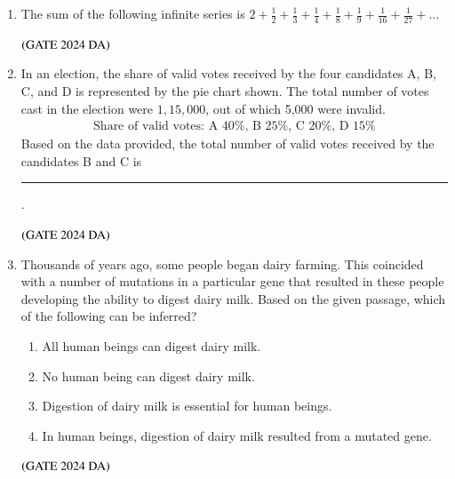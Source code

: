 \documentclass[journal,12pt,onecolumn]{IEEEtran}
\theoremstyle{remark}
\begin{document}
\begin{enumerate}
\item The sum of the following infinite series is $2+\frac{1}{2}+\frac{1}{3}+\frac{1}{4}+\frac{1}{8}+\frac{1}{9}+\frac{1}{16}+\frac{1}{27}+\dots$
\begin{enumerate}
\end{enumerate}
\hfill $\left(\text{GATE 2024 DA}\right)$


\item In an election, the share of valid votes received by the four candidates A, B, C, and D is represented by the pie chart shown. The total number of votes cast in the election were $1,15,000$, out of which 5,000 were invalid.
\begin{align*}
\text{Share of valid votes: A 40\%, B 25\%, C 20\%, D 15\%}
\end{align*}
Based on the data provided, the total number of valid votes received by the candidates B and C is  \rule{2cm}{0.5mm}.
\begin{enumerate}
\end{enumerate}
\hfill $\left(\text{GATE 2024 DA}\right)$


\item Thousands of years ago, some people began dairy farming. This coincided with a number of mutations in a particular gene that resulted in these people developing the ability to digest dairy milk.
Based on the given passage, which of the following can be inferred?
\begin{enumerate}
\item All human beings can digest dairy milk.
\item No human being can digest dairy milk.
\item Digestion of dairy milk is essential for human beings.
\item In human beings, digestion of dairy milk resulted from a mutated gene.
\end{enumerate}
\hfill $\left(\text{GATE 2024 DA}\right)$



\end{enumerate}
\end{document}
